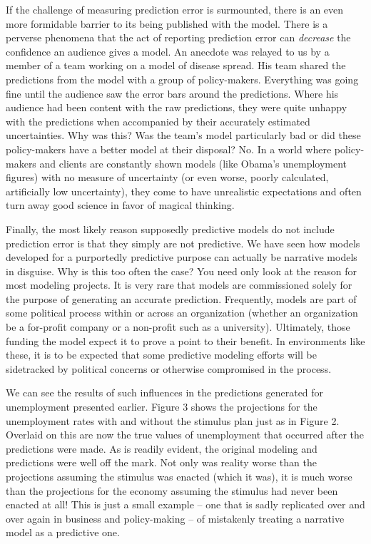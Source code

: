 \documentclass[]{memoir}
\begin{document}
If the challenge of measuring prediction error is surmounted, there is
an even more formidable barrier to its being published with the model.
There is a perverse phenomena that the act of reporting prediction error
can \emph{decrease} the confidence an audience gives a model. An
anecdote was relayed to us by a member of a team working on a model of
disease spread. His team shared the predictions from the model with a
group of policy-makers. Everything was going fine until the audience saw
the error bars around the predictions. Where his audience had been
content with the raw predictions, they were quite unhappy with the
predictions when accompanied by their accurately estimated
uncertainties. Why was this? Was the team's model particularly bad or
did these policy-makers have a better model at their disposal? No. In a
world where policy-makers and clients are constantly shown models (like
Obama's unemployment figures) with no measure of uncertainty (or even
worse, poorly calculated, artificially low uncertainty), they come to
have unrealistic expectations and often turn away good science in favor
of magical thinking.

Finally, the most likely reason supposedly predictive models do not
include prediction error is that they simply are not predictive. We have
seen how models developed for a purportedly predictive purpose can
actually be narrative models in disguise. Why is this too often the
case? You need only look at the reason for most modeling projects. It is
very rare that models are commissioned solely for the purpose of
generating an accurate prediction. Frequently, models are part of some
political process within or across an organization (whether an
organization be a for-profit company or a non-profit such as a
university). Ultimately, those funding the model expect it to prove a
point to their benefit. In environments like these, it is to be expected
that some predictive modeling efforts will be sidetracked by political
concerns or otherwise compromised in the process.

We can see the results of such influences in the predictions generated
for unemployment presented earlier. Figure 3 shows the projections for
the unemployment rates with and without the stimulus plan just as in
Figure 2. Overlaid on this are now the true values of unemployment that
occurred after the predictions were made. As is readily evident, the
original modeling and predictions were well off the mark. Not only was
reality worse than the projections assuming the stimulus was enacted
(which it was), it is much worse than the projections for the economy
assuming the stimulus had never been enacted at all! This is just a
small example -- one that is sadly replicated over and over again in
business and policy-making -- of mistakenly treating a narrative model
as a predictive one.
\end{document}
